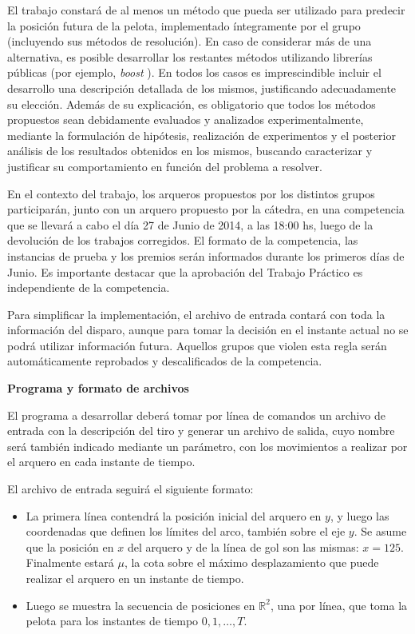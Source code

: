 \documentclass[11pt, a4paper]{article}
\begin{document}
El trabajo constar\'a de al menos un m\'etodo que pueda ser utilizado para predecir la posici\'on futura de la pelota,
implementado \'integramente por el grupo (incluyendo sus m\'etodos de resoluci\'on). En caso de
considerar m\'as de una alternativa, es posible desarrollar los restantes m\'etodos utilizando librer\'ias p\'ublicas (por
ejemplo, \emph{boost} \cite{BoostSite}). En todos los casos es imprescindible incluir el desarrollo una descripci\'on detallada
de los mismos, justificando adecuadamente su elecci\'on. Adem\'as de su explicaci\'on, es obligatorio que todos los m\'etodos propuestos 
sean debidamente evaluados y analizados experimentalmente, mediante la formulaci\'on de hip\'otesis, realizaci\'on de
experimentos y el posterior an\'alisis de los resultados obtenidos en los mismos, buscando caracterizar y justificar su
comportamiento en funci\'on del problema a resolver.

En el contexto del trabajo, los arqueros propuestos por los distintos grupos participar\'an, junto con un arquero
propuesto por la c\'atedra, en una competencia que se llevar\'a a cabo el d\'ia 27 de Junio de 2014, a las 18:00 hs,
luego de la devoluci\'on de los trabajos corregidos. El formato de la competencia, las instancias de prueba y los
premios ser\'an informados durante los primeros d\'ias de Junio. Es importante destacar que la aprobaci\'on del Trabajo
Pr\'actico es independiente de la competencia.

Para simplificar la implementaci\'on, el archivo de entrada contar\'a con toda
la informaci\'on del disparo, aunque para tomar la decisi\'on en el instante actual no se podr\'a utilizar informaci\'on
futura. Aquellos grupos que violen esta regla ser\'an autom\'aticamente reprobados y descalificados de la competencia.

\newpage

{\bf\noindent Programa y formato de archivos}

El programa a desarrollar deber\'a tomar por l\'inea de comandos un archivo de entrada con la descripci\'on del tiro y
generar un archivo de salida, cuyo nombre ser\'a tambi\'en indicado mediante un par\'ametro, con los movimientos a
realizar por el arquero en cada instante de tiempo.

El archivo de entrada seguir\'a el siguiente formato:
\begin{itemize}
\item La primera l\'inea contendr\'a la posici\'on inicial del arquero en $y$, y luego las coordenadas que definen los l\'imites del arco, tambi\'en sobre el eje $y$. Se asume que la posici\'on en $x$ del arquero y de la l\'inea de gol son las mismas: $x=125$. Finalmente estará $\mu$, la cota sobre el m\'aximo desplazamiento que puede realizar el arquero
en un instante de tiempo.
\item Luego se muestra la secuencia de posiciones en $\mathbb{R}^2$, una por l\'inea, que toma la pelota para los instantes de tiempo
$0,1,\dots,T$.
\end{itemize}
\end{document}
